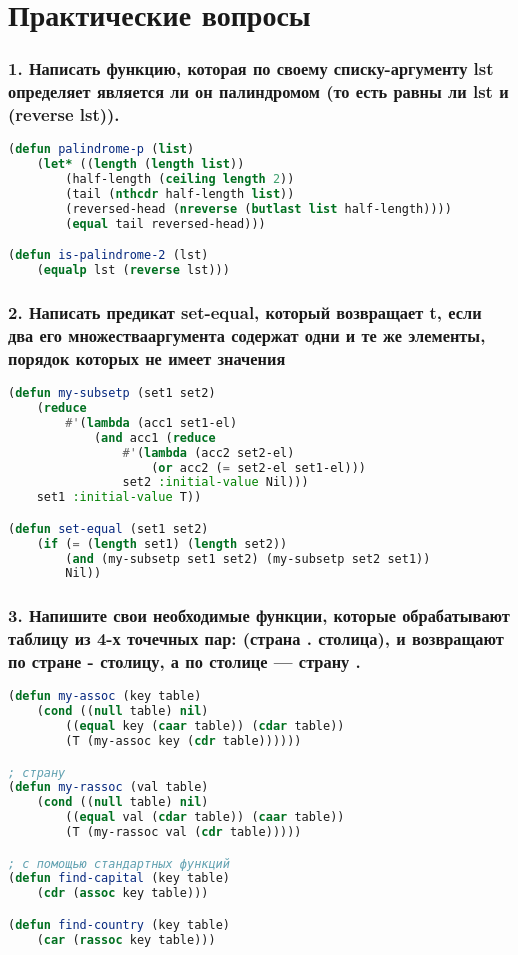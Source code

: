 \section*{Практические вопросы}


\subsubsection*{1. Написать функцию, которая по своему списку-аргументу lst определяет является ли он палиндромом (то есть равны ли lst и (reverse lst)).}
\begin{lstlisting}[language=Lisp]
(defun palindrome-p (list)
	(let* ((length (length list))
		(half-length (ceiling length 2))
		(tail (nthcdr half-length list))
		(reversed-head (nreverse (butlast list half-length))))
		(equal tail reversed-head)))

(defun is-palindrome-2 (lst)
	(equalp lst (reverse lst)))
\end{lstlisting}


\subsubsection*{2. Написать предикат set-equal, который возвращает t, если два его множествааргумента содержат одни и те же элементы, порядок которых не имеет значения}

\begin{lstlisting}[language=Lisp]
(defun my-subsetp (set1 set2)
	(reduce
		#'(lambda (acc1 set1-el)
			(and acc1 (reduce
				#'(lambda (acc2 set2-el)
					(or acc2 (= set2-el set1-el))) 
				set2 :initial-value Nil)))
	set1 :initial-value T))

(defun set-equal (set1 set2)
	(if (= (length set1) (length set2))
		(and (my-subsetp set1 set2) (my-subsetp set2 set1))
		Nil))
\end{lstlisting}

\newpage
\subsubsection*{3. Напишите свои необходимые функции, которые обрабатывают таблицу из 4-х точечных пар: (страна . столица), и возвращают по стране - столицу, а по столице — страну .}
\begin{lstlisting}[language=Lisp]
(defun my-assoc (key table)
	(cond ((null table) nil)
		((equal key (caar table)) (cdar table))
		(T (my-assoc key (cdr table))))))

; страну
(defun my-rassoc (val table)
	(cond ((null table) nil)
		((equal val (cdar table)) (caar table))
		(T (my-rassoc val (cdr table)))))

; с помощью стандартных функций
(defun find-capital (key table)
	(cdr (assoc key table)))

(defun find-country (key table)
	(car (rassoc key table)))
\end{lstlisting}

